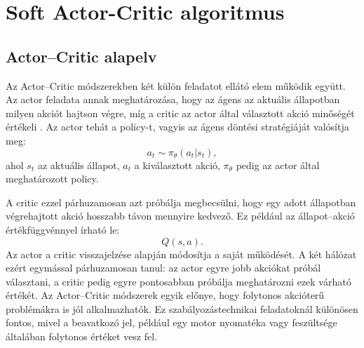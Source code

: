 \documentclass[12pt,a4paper]{report}
\begin{document}
	
	\section{Soft Actor-Critic algoritmus}
	\subsection{Actor--Critic alapelv}
	Az Actor--Critic módszerekben két külön feladatot ellátó elem működik együtt. Az actor feladata annak meghatározása, hogy az ágens az aktuális állapotban milyen akciót hajtson végre, míg a critic az actor által választott akció minőségét értékeli \cite{suttonbarto2018}.
	\newline
	\newline
	Az actor tehát a policy-t, vagyis az ágens döntési stratégiáját valósítja meg:
	\begin{equation}
		a_t \sim \pi_{\theta}(a_t|s_t),
	\end{equation}
	ahol $s_t$ az aktuális állapot, $a_t$ a kiválasztott akció, $\pi_{\theta}$ pedig az actor által meghatározott policy.
	
	A critic ezzel párhuzamosan azt próbálja megbecsülni, hogy egy adott állapotban végrehajtott akció hosszabb távon mennyire kedvező. Ez például az állapot--akció értékfüggvénnyel írható le:
	\begin{equation}
		Q(s,a).
	\end{equation}
	Az actor a critic visszajelzése alapján módosítja a saját működését. A két hálózat ezért egymással párhuzamosan tanul: az actor egyre jobb akciókat próbál választani, a critic pedig egyre pontosabban próbálja meghatározni ezek várható értékét.
	\newline
	\newline
	Az Actor--Critic módszerek egyik előnye, hogy folytonos akcióterű problémákra is jól alkalmazhatók. Ez szabályozástechnikai feladatoknál különösen fontos, mivel a beavatkozó jel, például egy motor nyomatéka vagy feszültsége általában folytonos értéket vesz fel.
\end{document}
